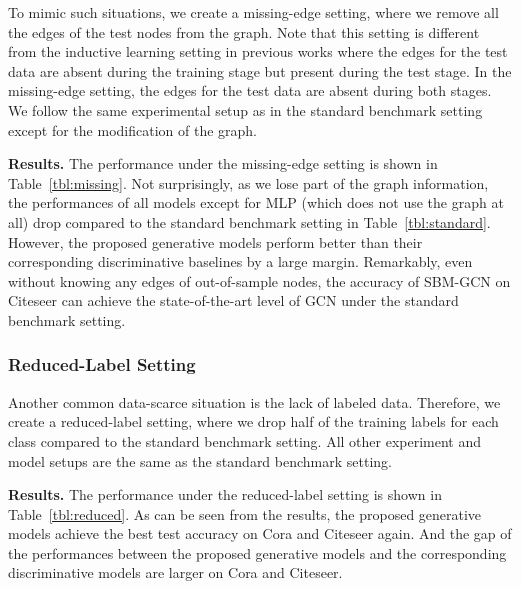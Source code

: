 \documentclass{article}
\newcommand{\vpara}[1]{\vspace{0.05in}\noindent\textbf{#1 }}
\begin{document}
To mimic such situations, we create a missing-edge setting, where we remove all the edges of the test nodes from the graph. Note that this setting is different from the inductive learning setting in previous works \cite{hamilton2017inductive,velivckovic2017graph} where the edges for the test data are absent during the training stage but present during the test stage. In the missing-edge setting, the edges for the test data are absent during both stages. We follow the same experimental setup as in the standard benchmark setting except for the modification of the graph. 



\vpara{Results.}
The performance under the missing-edge setting is shown in Table~\ref{tbl:missing}. Not surprisingly, as we lose part of the graph information, the performances of all models except for MLP (which does not use the graph at all) drop compared to the standard benchmark setting in Table~\ref{tbl:standard}. However, the proposed generative models perform better than their corresponding discriminative baselines by a large margin. Remarkably, even without knowing any edges of out-of-sample nodes, the accuracy of SBM-GCN on Citeseer can achieve the state-of-the-art level of GCN under the standard benchmark setting.

\subsubsection{Reduced-Label Setting}
Another common data-scarce situation is the lack of labeled data. Therefore, we create a reduced-label setting, where we drop half of the training labels for each class compared to the standard benchmark setting. All other experiment and model setups are the same as the standard benchmark setting.

\vpara{Results.}
The performance under the reduced-label setting is shown in Table~\ref{tbl:reduced}. As can be seen from the results, the proposed generative models achieve the best test accuracy on Cora and Citeseer again. And the gap of the performances between the proposed generative models and the corresponding discriminative models are larger on Cora and Citeseer. 
\end{document}
